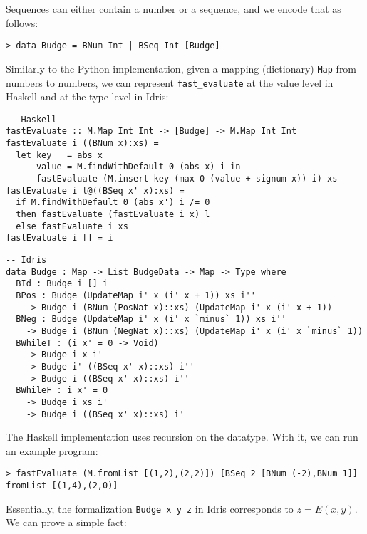 \documentclass{article}
\begin{document}
\pagebreak

Sequences can either contain a number or a sequence, and we encode that as follows:

\begin{lstlisting}
> data Budge = BNum Int | BSeq Int [Budge]
\end{lstlisting}

Similarly to the Python implementation, given a mapping (dictionary) \texttt{Map} from numbers to numbers, we can represent \texttt{fast\_evaluate} at the value level in Haskell and at the type level in Idris:

\begin{minipage}[t]{0.49\textwidth}
\begin{lstlisting}
-- Haskell
fastEvaluate :: M.Map Int Int -> [Budge] -> M.Map Int Int
fastEvaluate i ((BNum x):xs) =
  let key   = abs x
      value = M.findWithDefault 0 (abs x) i in
      fastEvaluate (M.insert key (max 0 (value + signum x)) i) xs
fastEvaluate i l@((BSeq x' x):xs) =
  if M.findWithDefault 0 (abs x') i /= 0
  then fastEvaluate (fastEvaluate i x) l
  else fastEvaluate i xs
fastEvaluate i [] = i
\end{lstlisting}
\end{minipage}
\begin{minipage}[t]{0.49\textwidth}
\begin{lstlisting}
-- Idris
data Budge : Map -> List BudgeData -> Map -> Type where
  BId : Budge i [] i
  BPos : Budge (UpdateMap i' x (i' x + 1)) xs i''
    -> Budge i (BNum (PosNat x)::xs) (UpdateMap i' x (i' x + 1))
  BNeg : Budge (UpdateMap i' x (i' x `minus` 1)) xs i''
    -> Budge i (BNum (NegNat x)::xs) (UpdateMap i' x (i' x `minus` 1))
  BWhileT : (i x' = 0 -> Void)
    -> Budge i x i'
    -> Budge i' ((BSeq x' x)::xs) i''
    -> Budge i ((BSeq x' x)::xs) i''
  BWhileF : i x' = 0
    -> Budge i xs i'
    -> Budge i ((BSeq x' x)::xs) i'
\end{lstlisting}
\end{minipage}

The Haskell implementation uses recursion on the datatype. With it, we can run an example program:

\begin{verbatim}
> fastEvaluate (M.fromList [(1,2),(2,2)]) [BSeq 2 [BNum (-2),BNum 1]]
fromList [(1,4),(2,0)]
\end{verbatim}

Essentially, the formalization \texttt{Budge x y z} in Idris corresponds to $z = E(x, y)$. We can prove a simple fact:
\end{document}
